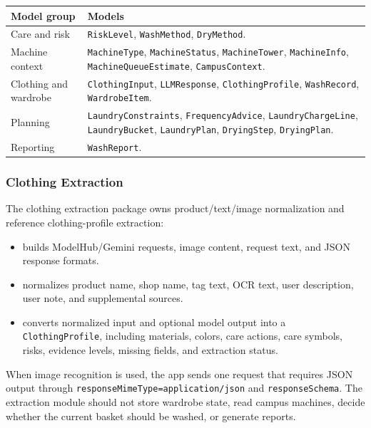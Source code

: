\documentclass[11pt,a4paper]{article}
\begin{document}
\begin{longtable}{p{} p{}}
\toprule
Model group & Models \\
\midrule
Care and risk & \texttt{RiskLevel}, \texttt{WashMethod}, \texttt{DryMethod}. \\
Machine context & \texttt{MachineType}, \texttt{MachineStatus}, \texttt{MachineTower}, \texttt{MachineInfo}, \texttt{MachineQueueEstimate}, \texttt{CampusContext}. \\
Clothing and wardrobe & \texttt{ClothingInput}, \texttt{LLMResponse}, \texttt{ClothingProfile}, \texttt{WashRecord}, \texttt{WardrobeItem}. \\
Planning & \texttt{LaundryConstraints}, \texttt{FrequencyAdvice}, \texttt{LaundryChargeLine}, \texttt{LaundryBucket}, \texttt{LaundryPlan}, \texttt{DryingStep}, \texttt{DryingPlan}. \\
Reporting & \texttt{WashReport}. \\
\bottomrule
\end{longtable}

\subsubsection{Clothing Extraction}

The clothing extraction package owns product/text/image normalization and reference clothing-profile extraction:

\begin{itemize}
  \item {} builds ModelHub/Gemini requests, image content, request text, and JSON response formats.
  \item {} normalizes product name, shop name, tag text, OCR text, user description, user note, and supplemental sources.
  \item {} converts normalized input and optional model output into a \texttt{ClothingProfile}, including materials, colors, care actions, care symbols, risks, evidence levels, missing fields, and extraction status.
\end{itemize}

When image recognition is used, the app sends one request that requires JSON output through \texttt{responseMimeType=application/json} and \texttt{responseSchema}. The extraction module should not store wardrobe state, read campus machines, decide whether the current basket should be washed, or generate reports.
\end{document}
